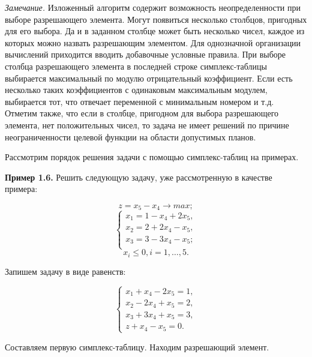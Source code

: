 \documentclass{article}
\begin{document}
\textit{Замечание.} Изложенный алгоритм содержит возможность неопределенности при выборе разрешающего элемента. Могут появиться несколько столбцов, пригодных для его выбора. Да и в заданном столбце может быть несколько чисел, каждое из которых можно назвать разрешающим элементом. Для однозначной организации вычислений приходится вводить добавочные условные правила. При выборе столбца разрешающего элемента в последней строке симплекс-таблицы выбирается максимальный по модулю отрицательный коэффициент. Если есть несколько таких коэффициентов с одинаковым максимальным модулем, выбирается тот, что отвечает переменной с минимальным номером и т.д. Отметим также, что если в столбце, пригодном для выбора разрешающего элемента, нет положительных чисел, то задача не имеет решений по причине неограниченности целевой функции на области допустимых планов.

Рассмотрим порядок решения задачи с помощью симплекс-таблиц на примерах.

\textbf{Пример 1.6.} Решить следующую задачу, уже рассмотренную в качестве примера:

$$z = x_5 - x_4 \rightarrow max ;$$
\begin{equation*}
\begin{cases}
	x_1 = 1 - x_4 + 2x_5,\\
	x_2 = 2 + 2x_4 - x_5,\\
	x_3 = 3 - 3x_4  - x_5;\\
\end{cases}
\end{equation*}
$$x_i \leq 0, i = 1, \dots , 5.$$

Запишем задачу  в  виде равенств:

\begin{equation*}
\begin{cases}
	x_1 + x_4 - 2x_5 = 1,\\
	x_2 - 2x_4 + x_5 = 2,\\
	x_3 + 3x_4  + x_5 = 3,\\
	z + x_4 - x_5 = 0.
\end{cases}
\end{equation*}

Составляем первую симплекс-таблицу. Находим разрешающий элемент.
\end{document}
